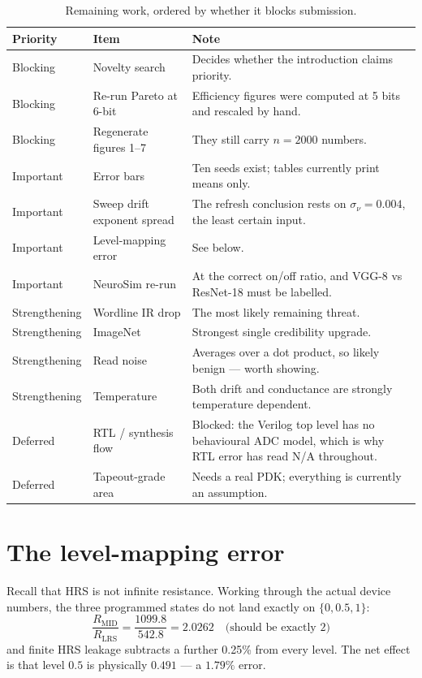 \documentclass[11pt,a4paper]{report}
\begin{document}
\begin{table}[h]
\centering
\caption{Remaining work, ordered by whether it blocks submission.}
\begin{tabular}{llp{6.4cm}}
\toprule
Priority & Item & Note \\
\midrule
Blocking & Novelty search & Decides whether the introduction claims priority. \\
Blocking & Re-run Pareto at 6-bit & Efficiency figures were computed at 5 bits and rescaled by hand. \\
Blocking & Regenerate figures 1--7 & They still carry $n=2000$ numbers. \\
\midrule
Important & Error bars & Ten seeds exist; tables currently print means only. \\
Important & Sweep drift exponent spread & The refresh conclusion rests on $\sigma_\nu = 0.004$, the least certain input. \\
Important & Level-mapping error & See below. \\
Important & NeuroSim re-run & At the correct on/off ratio, and VGG-8 vs ResNet-18 must be labelled. \\
\midrule
Strengthening & Wordline IR drop & The most likely remaining threat. \\
Strengthening & ImageNet & Strongest single credibility upgrade. \\
Strengthening & Read noise & Averages over a dot product, so likely benign --- worth showing. \\
Strengthening & Temperature & Both drift and conductance are strongly temperature dependent. \\
\midrule
Deferred & RTL / synthesis flow & Blocked: the Verilog top level has no behavioural ADC model, which is why RTL error has read N/A throughout. \\
Deferred & Tapeout-grade area & Needs a real PDK; everything is currently an assumption. \\
\bottomrule
\end{tabular}
\end{table}

\section{The level-mapping error}
\label{sec:levelerr}

Recall that HRS is not infinite resistance. Working through the actual device
numbers, the three programmed states do not land exactly on $\{0, 0.5, 1\}$:
\[
\frac{R_{\mathrm{MID}}}{R_{\mathrm{LRS}}} = \frac{1099.8}{542.8} = 2.0262
\quad\text{(should be exactly 2)}
\]
and finite HRS leakage subtracts a further 0.25\% from every level. The net
effect is that level $0.5$ is physically $0.491$ --- a $1.79\%$ error.
\end{document}
